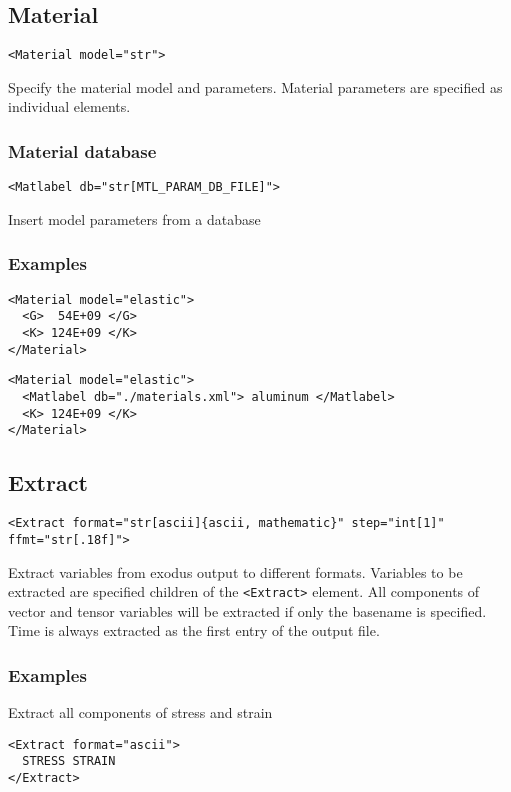\documentclass[11pt]{report}
\newcommand{\tag}[1]{\texttt{<#1>}}
\begin{document}
\subsection{Material}
\begin{verbatim}
<Material model="str">
\end{verbatim}
%
Specify the material model and parameters. Material parameters are specified
as individual elements.

\subsubsection{Material database}
\begin{verbatim}
<Matlabel db="str[MTL_PARAM_DB_FILE]">
\end{verbatim}
%
Insert model parameters from a database

\subsubsection{Examples}
\begin{verbatim}
<Material model="elastic">
  <G>  54E+09 </G>
  <K> 124E+09 </K>
</Material>
\end{verbatim}

\begin{verbatim}
<Material model="elastic">
  <Matlabel db="./materials.xml"> aluminum </Matlabel>
  <K> 124E+09 </K>
</Material>
\end{verbatim}

\subsection{Extract}
\begin{verbatim}
<Extract format="str[ascii]{ascii, mathematic}" step="int[1]" ffmt="str[.18f]">
\end{verbatim}
%
Extract variables from exodus output to different formats. Variables to be
extracted are specified children of the \tag{Extract} element. All components
of vector and tensor variables will be extracted if only the basename is
specified.  Time is always extracted as the first entry of the output file.

\subsubsection{Examples}
Extract all components of stress and strain
%
\begin{verbatim}
<Extract format="ascii">
  STRESS STRAIN
</Extract>
\end{verbatim}
\end{document}
